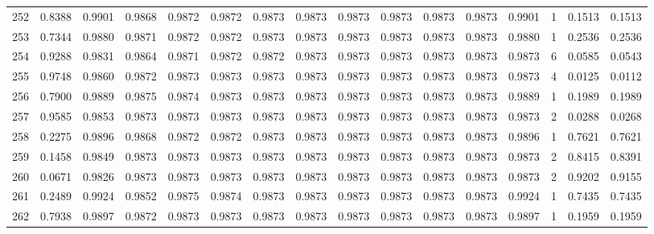 \begin{tabular}{lrrrrrrrrrrrrrrr}
252 &      0.8388 &  0.9901 &  0.9868 &  0.9872 &  0.9872 &  0.9873 &  0.9873 &  0.9873 &  0.9873 &  0.9873 &   0.9873 &     0.9901 &      1 &                    0.1513 &                     0.1513 \\
253 &      0.7344 &  0.9880 &  0.9871 &  0.9872 &  0.9872 &  0.9873 &  0.9873 &  0.9873 &  0.9873 &  0.9873 &   0.9873 &     0.9880 &      1 &                    0.2536 &                     0.2536 \\
254 &      0.9288 &  0.9831 &  0.9864 &  0.9871 &  0.9872 &  0.9872 &  0.9873 &  0.9873 &  0.9873 &  0.9873 &   0.9873 &     0.9873 &      6 &                    0.0585 &                     0.0543 \\
255 &      0.9748 &  0.9860 &  0.9872 &  0.9873 &  0.9873 &  0.9873 &  0.9873 &  0.9873 &  0.9873 &  0.9873 &   0.9873 &     0.9873 &      4 &                    0.0125 &                     0.0112 \\
256 &      0.7900 &  0.9889 &  0.9875 &  0.9874 &  0.9873 &  0.9873 &  0.9873 &  0.9873 &  0.9873 &  0.9873 &   0.9873 &     0.9889 &      1 &                    0.1989 &                     0.1989 \\
257 &      0.9585 &  0.9853 &  0.9873 &  0.9873 &  0.9873 &  0.9873 &  0.9873 &  0.9873 &  0.9873 &  0.9873 &   0.9873 &     0.9873 &      2 &                    0.0288 &                     0.0268 \\
258 &      0.2275 &  0.9896 &  0.9868 &  0.9872 &  0.9872 &  0.9873 &  0.9873 &  0.9873 &  0.9873 &  0.9873 &   0.9873 &     0.9896 &      1 &                    0.7621 &                     0.7621 \\
259 &      0.1458 &  0.9849 &  0.9873 &  0.9873 &  0.9873 &  0.9873 &  0.9873 &  0.9873 &  0.9873 &  0.9873 &   0.9873 &     0.9873 &      2 &                    0.8415 &                     0.8391 \\
260 &      0.0671 &  0.9826 &  0.9873 &  0.9873 &  0.9873 &  0.9873 &  0.9873 &  0.9873 &  0.9873 &  0.9873 &   0.9873 &     0.9873 &      2 &                    0.9202 &                     0.9155 \\
261 &      0.2489 &  0.9924 &  0.9852 &  0.9875 &  0.9874 &  0.9873 &  0.9873 &  0.9873 &  0.9873 &  0.9873 &   0.9873 &     0.9924 &      1 &                    0.7435 &                     0.7435 \\
262 &      0.7938 &  0.9897 &  0.9872 &  0.9873 &  0.9873 &  0.9873 &  0.9873 &  0.9873 &  0.9873 &  0.9873 &   0.9873 &     0.9897 &      1 &                    0.1959 &                     0.1959 \\

\end{tabular}
